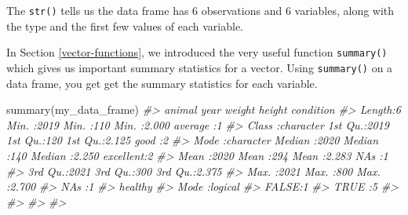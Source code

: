 \documentclass[
]{book}
\newenvironment{Shaded}{\begin{snugshade}}{\end{snugshade}}
\newcommand{\CommentTok}[1]{\textcolor[rgb]{0.56,0.35,0.01}{\textit{#1}}}
\newcommand{\FunctionTok}[1]{\textcolor[rgb]{0.00,0.00,0.00}{#1}}
\newcommand{\NormalTok}[1]{#1}
\begin{document}
\begin{Shaded}
\end{Shaded}

The \texttt{str()} tells us the data frame has 6 observations and 6 variables, along with the type and the first few values of each variable.

In Section \ref{vector-functions}, we introduced the very useful function \texttt{summary()} which gives us important summary statistics for a vector. Using \texttt{summary()} on a data frame, you get get the summary statistics for each variable.

\begin{Shaded}
\begin{Highlighting}[]
\FunctionTok{summary}\NormalTok{(my\_data\_frame)}
\CommentTok{\#\textgreater{}     animal               year          weight        height          condition}
\CommentTok{\#\textgreater{}  Length:6           Min.   :2019   Min.   :110   Min.   :2.000   average  :1  }
\CommentTok{\#\textgreater{}  Class :character   1st Qu.:2019   1st Qu.:120   1st Qu.:2.125   good     :2  }
\CommentTok{\#\textgreater{}  Mode  :character   Median :2020   Median :140   Median :2.250   excellent:2  }
\CommentTok{\#\textgreater{}                     Mean   :2020   Mean   :294   Mean   :2.283   NA\textquotesingle{}s     :1  }
\CommentTok{\#\textgreater{}                     3rd Qu.:2021   3rd Qu.:300   3rd Qu.:2.375                }
\CommentTok{\#\textgreater{}                     Max.   :2021   Max.   :800   Max.   :2.700                }
\CommentTok{\#\textgreater{}                                    NA\textquotesingle{}s   :1                                  }
\CommentTok{\#\textgreater{}   healthy       }
\CommentTok{\#\textgreater{}  Mode :logical  }
\CommentTok{\#\textgreater{}  FALSE:1        }
\CommentTok{\#\textgreater{}  TRUE :5        }
\CommentTok{\#\textgreater{}                 }
\CommentTok{\#\textgreater{}                 }
\CommentTok{\#\textgreater{}                 }
\CommentTok{\#\textgreater{} }
\end{Highlighting}
\end{Shaded}
\end{document}
